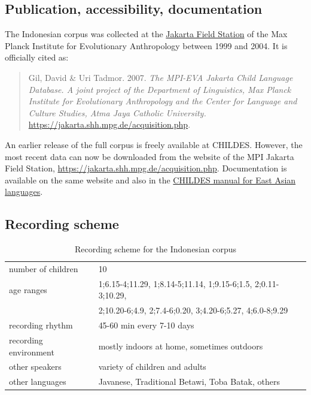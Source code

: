 \documentclass[a4paper, 11pt]{book}
\begin{document}
\subsection{Publication, accessibility, documentation}
The Indonesian corpus \citep{Gil_etal2007a} was collected at the \href{http://lingweb.eva.mpg.de/jakarta/acquisition.php}{Jakarta Field Station} of the Max Planck Institute for Evolutionary Anthropology between 1999 and 2004. It is officially cited as:

\begin{quote}
Gil, David \& Uri Tadmor. 2007. \emph{The MPI-EVA Jakarta Child Language Database. A joint project of the Department of Linguistics, Max Planck Institute for Evolutionary Anthropology and the Center for Language and Culture Studies, Atma Jaya Catholic University.} \url{https://jakarta.shh.mpg.de/acquisition.php}.
\end{quote}	

An earlier release of the full corpus is freely available at CHILDES. However, the most recent data can now be downloaded from the website of the MPI Jakarta Field Station, \url{https://jakarta.shh.mpg.de/acquisition.php}. Documentation is available on the same website and also in the \href{http://childes.psy.cmu.edu/manuals/10eastasian.pdf}{CHILDES manual for East Asian languages}. 

\subsection{Recording scheme}

\begin{table}[ht]
	\centering
	\begin{tabular}{ll}
		\toprule
		number of children 	& 10 \\
		age ranges 			& 1;6.15-4;11.29, 1;8.14-5;11.14, 1;9.15-6;1.5, 2;0.11-3;10.29, \\
							& 2;10.20-6;4.9, 2;7.4-6;0.20, 3;4.20-6;5.27, 4;6.0-8;9.29 \\
		recording rhythm 	& 45-60 min every 7-10 days \\
		recording environment & mostly indoors at home, sometimes outdoors \\
		other speakers 		& variety of children and adults \\
		other languages		& Javanese, Traditional Betawi, Toba Batak, others \\
		\bottomrule
	\end{tabular}
	\caption{Recording scheme for the Indonesian corpus}
	\label{tab:Indonesian recording scheme}
\end{table}
\end{document}

